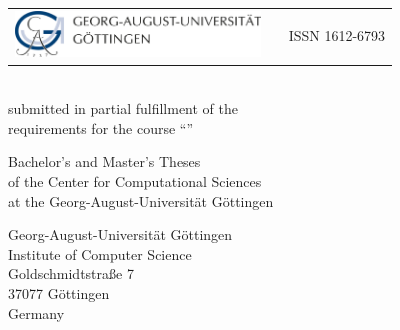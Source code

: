 %
%

\begin{titlepage}
    \normalsize
    \begin{tabularx}{\textwidth}{lXr}
        \multirow{2}{*}{\includegraphics[width=6.5cm]{images/goe-logo.jpg}} 
        & & ISSN 1612-6793\\
    \end{tabularx}

    \large
    \centering

    \vspace{3cm}

    \textbf{\LARGE \mytype}\\

    submitted in partial fulfillment of the\\
    requirements for the course ``\mycourse''

    \vspace{2cm}

    \textbf{\LARGE \mytitle}

    \vspace{2cm}

    \myauthor

    \vspace{2cm}

    \mydepartment

    \vspace{2cm}

    Bachelor's and Master's Theses\\
    of the Center for Computational Sciences\\
    at the Georg-August-Universität Göttingen

    \vspace{0.2cm}

    \mysubmissiondate


    \myemptypage
    \clearpage
    \thispagestyle{empty}
    \null
    \flushleft
    \onehalfspacing
    \normalsize

    \vspace{12cm}

    Georg-August-Universität Göttingen\\
    Institute of Computer Science\\[3ex]
    Goldschmidtstraße 7\\
    37077 Göttingen\\
    Germany\\[3ex]


\end{titlepage}
